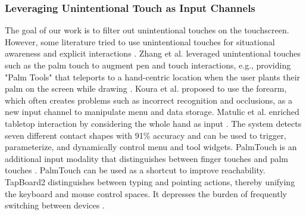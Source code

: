 

\subsubsection{Leveraging Unintentional Touch as Input Channels}

The goal of our work is to filter out unintentional touches on the touchscreen. However, some literature tried to use unintentional touches for situational awareness \cite{2019-PenTouch} and explicit interactions \cite{2017-HandContact, 2018-PalmTouch, 2016-TapBoard2}. Zhang et al. leveraged unintentional touches such as the palm touch to augment pen and touch interactions, e.g., providing "Palm Tools" that teleports to a hand-centric location when the user plants their palm on the screen while drawing \cite{2019-PenTouch}. Koura et al. \cite{2012-Amazing} proposed to use the forearm, which often creates problems such as incorrect recognition and occlusions, as a new input channel to manipulate menu and data storage. Matulic et al. enriched tabletop interaction by considering the whole hand as input \cite{2017-HandContact}. The system detects seven different contact shapes with 91\% accuracy and can be used to trigger, parameterize, and dynamically control menu and tool widgets. PalmTouch is an additional input modality that distinguishes between finger touches and palm touches \cite{2018-PalmTouch}. PalmTouch can be used as a shortcut to improve reachability. TapBoard2 \cite{2016-TapBoard2} distinguishes between typing and pointing actions, thereby unifying the keyboard and mouse control spaces. It depresses the burden of frequently switching between devices \cite{2006-TouchType}.

